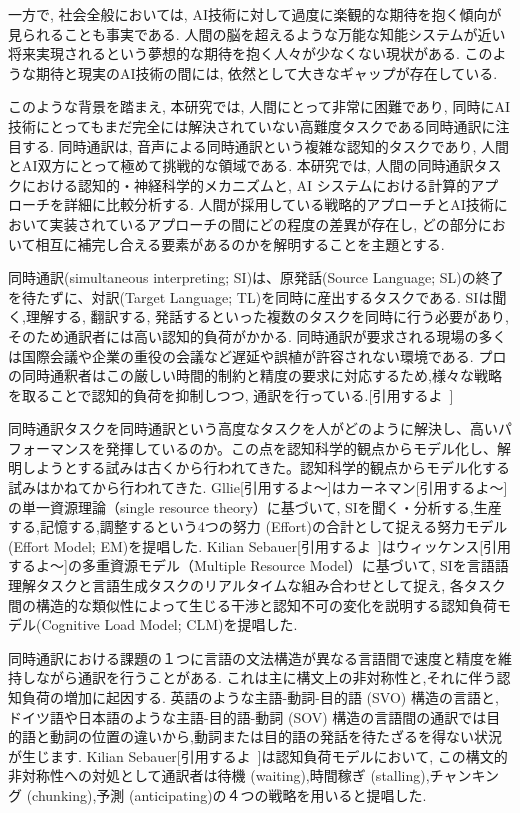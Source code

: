 一方で, 社会全般においては, AI技術に対して過度に楽観的な期待を抱く傾向が見られることも事実である.
人間の脳を超えるような万能な知能システムが近い将来実現されるという夢想的な期待を抱く人々が少なくない現状がある.
このような期待と現実のAI技術の間には, 依然として大きなギャップが存在している.

このような背景を踏まえ, 本研究では, 人間にとって非常に困難であり, 同時にAI技術にとってもまだ完全には解決されていない高難度タスクである同時通訳に注目する.
同時通訳は, 音声による同時通訳という複雑な認知的タスクであり, 人間とAI双方にとって極めて挑戦的な領域である.
本研究では, 人間の同時通訳タスクにおける認知的・神経科学的メカニズムと, AI システムにおける計算的アプローチを詳細に比較分析する.
人間が採用している戦略的アプローチとAI技術において実装されているアプローチの間にどの程度の差異が存在し, どの部分において相互に補完し合える要素があるのかを解明することを主題とする.

同時通訳(simultaneous interpreting; SI)は、原発話(Source Language; SL)の終了を待たずに、対訳(Target Language; TL)を同時に産出するタスクである.
SIは聞く,理解する, 翻訳する, 発話するといった複数のタスクを同時に行う必要があり, そのため通訳者には高い認知的負荷がかかる. 
同時通訳が要求される現場の多くは国際会議や企業の重役の会議など遅延や誤植が許容されない環境である.
プロの同時通釈者はこの厳しい時間的制約と精度の要求に対応するため,様々な戦略を取ることで認知的負荷を抑制しつつ, 通訳を行っている.[引用するよ~]

同時通訳タスクを同時通訳という高度なタスクを人がどのように解決し、高いパフォーマンスを発揮しているのか。この点を認知科学的観点からモデル化し、解明しようとする試みは古くから行われてきた。認知科学的観点からモデル化する試みはかねてから行われてきた.
Gllie[引用するよ〜]はカーネマン[引用するよ〜]の単一資源理論（single resource theory）に基づいて, SIを聞く・分析する,生産する,記憶する,調整するという4つの努力 (Effort)の合計として捉える努力モデル(Effort Model; EM)を提唱した.
Kilian Sebauer[引用するよ~]はウィッケンス[引用するよ〜]の多重資源モデル（Multiple Resource Model）に基づいて, SIを言語語理解タスクと言語生成タスクのリアルタイムな組み合わせとして捉え, 各タスク間の構造的な類似性によって生じる干渉と認知不可の変化を説明する認知負荷モデル(Cognitive Load Model; CLM)を提唱した.

同時通訳における課題の１つに言語の文法構造が異なる言語間で速度と精度を維持しながら通訳を行うことがある.
これは主に構文上の非対称性と,それに伴う認知負荷の増加に起因する.
英語のような主語-動詞-目的語 (SVO) 構造の言語と, ドイツ語や日本語のような主語-目的語-動詞 (SOV) 構造の言語間の通訳では目的語と動詞の位置の違いから,動詞または目的語の発話を待たざるを得ない状況が生じます.
Kilian Sebauer[引用するよ~]は認知負荷モデルにおいて, この構文的非対称性への対処として通訳者は待機 (waiting),時間稼ぎ (stalling),チャンキング (chunking),予測 (anticipating)の４つの戦略を用いると提唱した.

